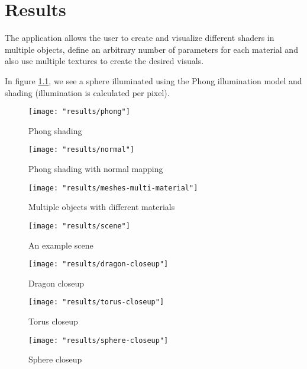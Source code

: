 \chapter{Results}
The application allows the user to create and visualize different shaders in multiple objects, define an arbitrary number of parameters for each material and also use multiple textures to create the desired visuals.

In figure \ref{fig:phong_sphere}, we see a sphere illuminated using the Phong illumination model and shading (illumination is calculated per pixel). 

\begin{figure}
    \centering
    \caption{Phong shading}
    \texttt{[image: "results/phong"]}
    \label{fig:phong_sphere}
\end{figure}

\begin{figure}
    \centering
    \caption{Phong shading with normal mapping}
    \texttt{[image: "results/normal"]}
    \label{fig:phong_normal_sphere}
\end{figure}

\begin{figure}
    \centering
    \caption{Multiple objects with different materials}
    \texttt{[image: "results/meshes-multi-material"]}
    \label{fig:scene_1}
\end{figure}

\begin{figure}
    \centering
    \caption{An example scene}
    \texttt{[image: "results/scene"]}
    \label{fig:scene_2}
\end{figure}

\begin{figure}
    \centering
    \caption{Dragon closeup}
    \texttt{[image: "results/dragon-closeup"]}
    \label{fig:dragon_closeup}
\end{figure}

\begin{figure}
    \centering
    \caption{Torus closeup}
    \texttt{[image: "results/torus-closeup"]}
    \label{fig:torus_closeup}
\end{figure}

\begin{figure}
    \centering
    \caption{Sphere closeup}
    \texttt{[image: "results/sphere-closeup"]}
    \label{fig:sphere_closeup}
\end{figure}
